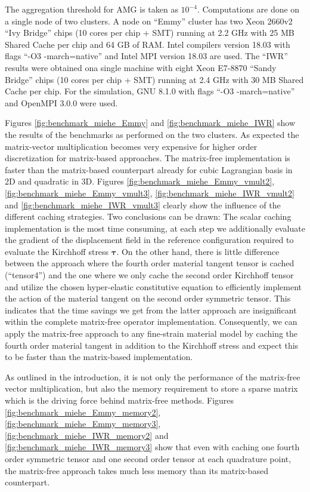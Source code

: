 \documentclass[preprint,12pt,times]{elsarticle}
\def\gz  #1{           \mbox{$\boldsymbol{#1}$}}
\begin{document}
The aggregation threshold for AMG is taken as $10^{-4}$.
Computations are done on a single node of two clusters.
A node on ``Emmy'' cluster has two Xeon 2660v2 ``Ivy Bridge'' chips (10 cores per chip + SMT) running at 2.2 GHz with 25 MB Shared Cache per chip and 64 GB of RAM. Intel compilers version 18.03 with flags ``-O3 -march=native'' and Intel MPI version 18.03 are used.
The ``IWR'' results were obtained ona single machine with eight Xeon E7-8870 ``Sandy Bridge'' chips (10 cores per chip  + SMT) running at 2.4 GHz with 30 MB Shared Cache per chip. For the simulation, GNU 8.1.0 with flags ``-O3 -march=native'' and OpenMPI 3.0.0 were used.

Figures \ref{fig:benchmark_miehe_Emmy} and \ref{fig:benchmark_miehe_IWR} show the results of the benchmarks as performed on the two clusters.
As expected the matrix-vector multiplication becomes very expensive for higher order discretization for matrix-based approaches.
The matrix-free implementation is faster than the matrix-based counterpart already for cubic Lagrangian basis in 2D and quadratic in 3D.
Figures \ref{fig:benchmark_miehe_Emmy_vmult2}, \ref{fig:benchmark_miehe_Emmy_vmult3}, \ref{fig:benchmark_miehe_IWR_vmult2} and \ref{fig:benchmark_miehe_IWR_vmult3} clearly show the influence of the different caching strategies.
Two conclusions can be drawn: The scalar caching implementation is the most time consuming, at each step we additionally evaluate the gradient of the displacement field in the reference configuration required to evaluate the Kirchhoff stress $\gz \tau$. On the other hand, there is little difference between the approach where the fourth order material tangent tensor is cached (``tensor4'') and the one where we only cache the second order Kirchhoff tensor and utilize the chosen hyper-elastic constitutive equation to efficiently implement the action of the material tangent on the second order symmetric tensor.
This indicates that the time savings we get from the latter approach are insignificant within the complete matrix-free operator implementation.
Consequently, we can apply the matrix-free approach to any fine-strain material model by caching the fourth order material tangent in addition to the Kirchhoff stress and expect this to be faster than the matrix-based implementation.

As outlined in the introduction, it is not only the performance of the matrix-free vector multiplication, but also the memory requirement to store a sparse matrix which is the driving force behind matrix-free methods.
Figures \ref{fig:benchmark_miehe_Emmy_memory2}, \ref{fig:benchmark_miehe_Emmy_memory3}, \ref{fig:benchmark_miehe_IWR_memory2} and \ref{fig:benchmark_miehe_IWR_memory3} show that even with caching one fourth order symmetric tensor and one second order tensor at each quadrature point, the matrix-free approach takes much less memory than its matrix-based counterpart.
\end{document}
